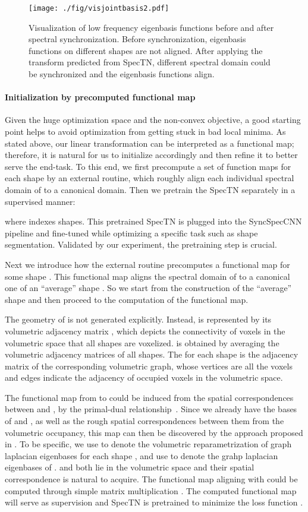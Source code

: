 \documentclass[10pt,twocolumn,letterpaper]{article}
\newcommand{\mypara}{\vspace*{-15pt}\paragraph}
\begin{document}
 
\begin{figure}[t!]
    \centering
    \texttt{[image: ./fig/visjointbasis2.pdf]}
    \caption{Visualization of low frequency eigenbasis functions before and after spectral synchronization. Before synchronization, eigenbasis functions on different shapes are not aligned. After applying the transform predicted from SpecTN, different spectral domain could be synchronized and the eigenbasis functions align.}
    \label{fig:jointbasis}
\end{figure}


\mypara{Initialization by precomputed functional map} 
Given the huge optimization space and the non-convex objective, a good starting point helps to avoid optimization from getting stuck in bad local minima. As stated above, our linear transformation  can be interpreted as a functional map; therefore, it is natural for us to initialize  accordingly and then refine it to better serve the end-task. To this end, we first precompute a set of function maps  for each shape by an external routine, which roughly align each individual spectral domain of  to a canonical domain. Then we pretrain the SpecTN separately in a supervised manner:

where  indexes shapes.
This pretrained SpecTN is plugged into the  SyncSpecCNN pipeline and fine-tuned while optimizing a specific task such as shape segmentation.  Validated by our experiment, the pretraining step is crucial. 

Next we introduce how the external routine precomputes a functional map for some shape . This functional map aligns the spectral domain of  to a canonical one of an ``average'' shape . So we start from the construction of the ``average'' shape and then proceed to the computation of the functional map. 

The geometry of  is not generated explicitly. Instead,  is represented by its volumetric adjacency matrix , which depicts the connectivity of voxels in the volumetric space that all shapes are voxelized.  is obtained by averaging the volumetric adjacency matrices  of all shapes. The  for each shape  is the adjacency matrix of the corresponding volumetric graph, whose vertices are all the voxels and edges indicate the adjacency of occupied voxels in the volumetric space.

The functional map  from  to  could be induced from the spatial correspondences between  and , by the primal-dual relationship~\cite{ovsjanikov2012functional}. Since we already have the bases of  and , as well as the rough spatial correspondences between them from the volumetric occupancy, this map can then be discovered by the approach proposed in \cite{ovsjanikov2012functional}. To be specific, we use  to denote the volumetric reparametrization of graph laplacian eigenbases  for each shape , and use  to denote the grahp laplacian eigenbases of .  and  both lie in the volumetric space and their spatial correspondence is natural to acquire. The functional map  aligning  with  could be computed through simple matrix multiplication . The computed functional map will serve as supervision and SpecTN is pretrained to minimize the loss function .
\end{document}
